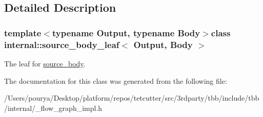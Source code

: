 \subsection{Detailed Description}
\subsubsection*{template$<$typename Output, typename Body$>$class internal\+::source\+\_\+body\+\_\+leaf$<$ Output, Body $>$}

The leaf for \hyperlink{classinternal_1_1source__body}{source\+\_\+body}. 

The documentation for this class was generated from the following file\+:\begin{DoxyCompactItemize}
\item 
/\+Users/pourya/\+Desktop/platform/repos/tetcutter/src/3rdparty/tbb/include/tbb/internal/\+\_\+flow\+\_\+graph\+\_\+impl.\+h\end{DoxyCompactItemize}
